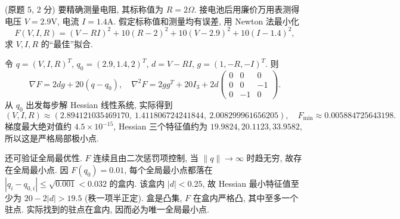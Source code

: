 \begin{exercise}\label{ps4-q5}
(原题 5, 2 分) 要精确测量电阻, 其标称值为 $R=2\Omega$. 接电池后用廉价万用表测得电压 $V=2.9\mathrm V$, 电流 $I=1.4\mathrm A$. 假定标称值和测量均有误差, 用 Newton 法最小化
\[
F(V,I,R)=(V-RI)^2+10(R-2)^2+10(V-2.9)^2+10(I-1.4)^2,
\]
求 $V,I,R$ 的“最佳”拟合.
\end{exercise}
\begin{solution}
令 $q=(V,I,R)^T$, $q_0=(2.9,1.4,2)^T$, $d=V-RI$,
$g=(1,-R,-I)^T$. 则
\[
\nabla F=2dg+20(q-q_0),\quad
\nabla^2F=2gg^T+20I_3+2d
\begin{pmatrix}0&0&0\\0&0&-1\\0&-1&0\end{pmatrix}.
\]
从 $q_0$ 出发每步解 Hessian 线性系统, 实际得到
\[
(V,I,R)\approx(2.894121035469170,\ 1.411806724241844,\ 2.008299961656205),
\quad F_{\min}\approx0.005884725643198.
\]
梯度最大绝对值约 $4.5\times10^{-15}$, Hessian 三个特征值约为 $19.9824,20.1123,33.9582$, 所以这是严格局部极小点.

还可验证全局最优性. $F$ 连续且由二次惩罚项控制, 当 $\|q\|\to\infty$ 时趋无穷, 故存在全局最小点. 因 $F(q_0)=0.01$, 每个全局最小点都落在
$|q_i-q_{0,i}|\le\sqrt{0.001}<0.032$ 的盒内. 该盒内
$|d|<0.25$, 故 Hessian 最小特征值至少为 $20-2|d|>19.5$ (秩一项半正定). 盒是凸集, $F$ 在盒内严格凸, 其中至多一个驻点. 实际找到的驻点在盒内, 因而必为唯一全局最小点.
\end{solution}
